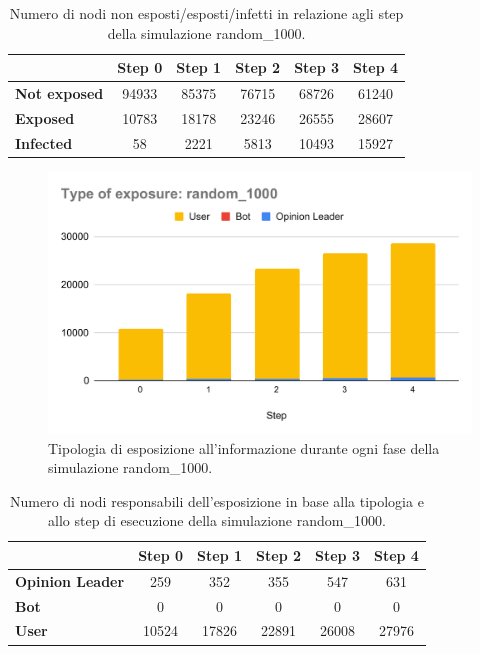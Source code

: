        \begin{table}[H]
            \centering
            \begin{tabular}{l|c|c|c|c|c}
                        & Step 0 & Step 1 & Step 2 & Step 3 & Step 4 \\ \hline
            \textbf{Not exposed} & 94933  & 85375  & 76715  & 68726  & 61240  \\ \hline
            \textbf{Exposed}     & 10783  & 18178  & 23246  & 26555  & 28607  \\ \hline
            \textbf{Infected}    & 58     & 2221   & 5813   & 10493  & 15927  \\
            \end{tabular}
            
            \caption{Numero di nodi non esposti/esposti/infetti in relazione agli step della simulazione random\_1000.}
        \end{table}

        \begin{figure}[H]
            \centering
            \includegraphics[width=.7\textwidth]{resources/charts/Type of exposure_ random_1000.pdf}
            \caption{Tipologia di esposizione all'informazione durante ogni fase della simulazione random\_1000.}
        \end{figure}
        
        \begin{table}[H]
            \centering
            \begin{tabular}{l|c|c|c|c|c}
                           & Step 0 & Step 1 & Step 2 & Step 3 & Step 4 \\ \hline
            \textbf{Opinion Leader} & 259    & 352    & 355    & 547    & 631    \\ \hline
            \textbf{Bot}            & 0      & 0      & 0      & 0      & 0      \\ \hline
            \textbf{User}           & 10524  & 17826  & 22891  & 26008  & 27976  \\
            \end{tabular}
            \caption{Numero di nodi responsabili dell'esposizione in base alla tipologia e allo step di esecuzione della simulazione random\_1000.}
        \end{table}

